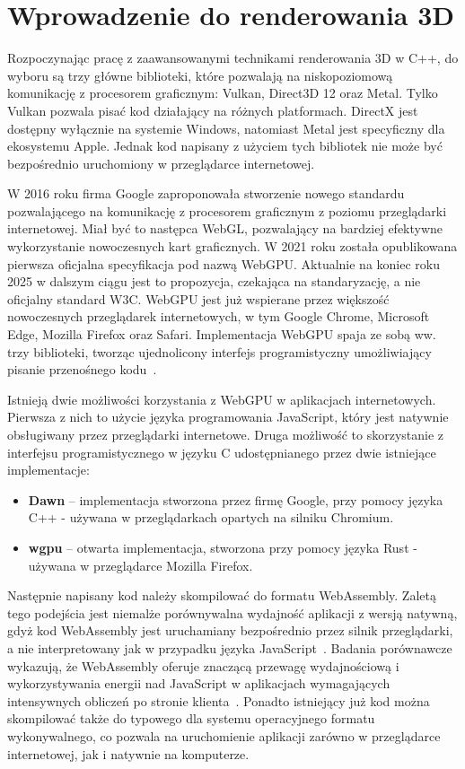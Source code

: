 \section{Wprowadzenie do renderowania 3D}

Rozpoczynając pracę z zaawansowanymi technikami renderowania 3D w C++, do wyboru są trzy główne biblioteki, które pozwalają na niskopoziomową komunikację z procesorem graficznym: Vulkan, Direct3D 12 oraz Metal. Tylko Vulkan pozwala pisać kod działający na różnych platformach. DirectX jest dostępny wyłącznie na systemie Windows, natomiast Metal jest specyficzny dla ekosystemu Apple. Jednak kod napisany z użyciem tych bibliotek nie może być bezpośrednio uruchomiony w przeglądarce internetowej.

W 2016 roku firma Google zaproponowała stworzenie nowego standardu pozwalającego na komunikację z procesorem graficznym z poziomu przeglądarki internetowej. Miał być to następca WebGL, pozwalający na bardziej efektywne wykorzystanie nowoczesnych kart graficznych. W 2021 roku została opublikowana pierwsza oficjalna specyfikacja pod nazwą WebGPU. Aktualnie na koniec roku 2025 w dalszym ciągu jest to propozycja, czekająca na standaryzację, a nie oficjalny standard W3C. WebGPU jest już wspierane przez większość nowoczesnych przeglądarek internetowych, w tym Google Chrome, Microsoft Edge, Mozilla Firefox oraz Safari. Implementacja WebGPU spaja ze sobą ww. trzy biblioteki, tworząc ujednolicony interfejs programistyczny umożliwiający pisanie przenośnego kodu~\cite{10.1145/3746237.3746305}.

Istnieją dwie możliwości korzystania z WebGPU w aplikacjach internetowych. Pierwsza z nich to użycie języka programowania JavaScript, który jest natywnie obsługiwany przez przeglądarki internetowe. Druga możliwość to skorzystanie z interfejsu programistycznego w języku C udostępnianego przez dwie istniejące implementacje:
\begin{itemize}
  \item \textbf{Dawn} – implementacja stworzona przez firmę Google, przy pomocy języka C++ - używana w przeglądarkach opartych na silniku Chromium.~\cite{Dawn}
  \item \textbf{wgpu} – otwarta implementacja, stworzona przy pomocy języka Rust - używana w przeglądarce Mozilla Firefox.~\cite{wgpu}
\end{itemize}
Następnie napisany kod należy skompilować do formatu WebAssembly. Zaletą tego podejścia jest niemalże porównywalna wydajność aplikacji z wersją natywną, gdyż kod WebAssembly jest uruchamiany bezpośrednio przez silnik przeglądarki, a nie interpretowany jak w przypadku języka JavaScript~\cite{gallant2019}. Badania porównawcze wykazują, że WebAssembly oferuje znaczącą przewagę wydajnościową i wykorzystywania energii nad JavaScript w aplikacjach wymagających intensywnych obliczeń po stronie klienta~\cite{9830108}. Ponadto istniejący już kod można skompilować także do typowego dla systemu operacyjnego formatu wykonywalnego, co pozwala na uruchomienie aplikacji zarówno w przeglądarce internetowej, jak i natywnie na komputerze.

